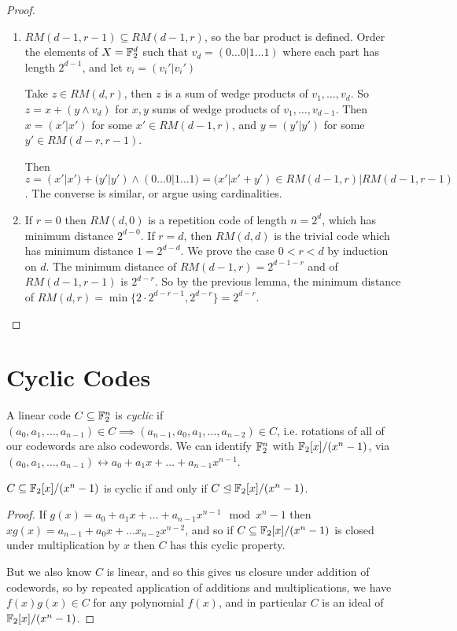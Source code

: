 \documentclass[10pt,a4paper]{article}
\begin{document}
\begin{proof}
\item
\begin{enumerate}
\item $RM(d-1, r-1) \subseteq RM(d-1, r)$, so the bar product is defined. Order the elements of $X = \mathbb{F}_2^d$ such that $v_d = (0\ldots 0 |1\ldots 1)$ where each part has length $2^{d-1}$, and let $v_i = (v_i'|v_i')$

Take $z \in RM(d,r)$, then $z$ is a sum of wedge products of $v_1, \ldots, v_d$. So $z = x+(y \wedge v_d)$ for $x,y$ sums of wedge products of $v_1, \ldots, v_{d-1}$. Then $x = (x'|x')$ for some $x' \in RM(d-1,r)$, and $y = (y'|y')$ for some $y' \in RM(d-r, r-1)$.

Then $z = (x'|x') + (y'|y')\wedge (0\ldots 0|1\ldots 1) = (x'|x'+y') \in RM(d-1,r)|RM(d-1,r-1)$. The converse is similar, or argue using cardinalities.

\item If $r=0$ then $RM(d,0)$ is a repetition code of length $n = 2^d$, which has minimum distance $2^{d-0}$. If $r=d$, then $RM(d,d)$ is the trivial code which has minimum distance $1=2^{d-d}$. We prove the case $0 < r < d$ by induction on $d$. The minimum distance of $RM(d-1,r) = 2^{d-1-r}$ and of $RM(d-1,r-1)$ is $2^{d-r}$. So by the previous lemma, the minimum distance of $RM(d,r) = \min \{2\cdot 2^{d-r-1}, 2^{d-r}\} = 2^{d-r}$.
\end{enumerate}
\end{proof}

\section{Cyclic Codes}
A linear code $C \subseteq \mathbb{F}_2^n$ is \emph{cyclic} if $(a_0, a_1, \ldots, a_{n-1}) \in C \implies (a_{n-1}, a_0, a_1, \ldots, a_{n-2}) \in C$, i.e. rotations of all of our codewords are also codewords. We can identify $\mathbb{F}_2^n$ with $\mathbb{F}_2[x]/(x^n-1)$, via $(a_0,a_1, \ldots, a_{n-1}) \leftrightarrow a_0 + a_1x+\ldots+a_{n-1}x^{n-1}$.
\begin{lemma}
$C \subseteq \mathbb{F}_2[x]/(x^n-1)$ is cyclic if and only if $C \trianglelefteq \mathbb{F}_2[x]/(x^n-1)$.
\end{lemma}
\begin{proof}
If $g(x) = a_0 + a_1 x + \ldots + a_{n-1} x^{n-1} \mod x^n-1$ then $xg(x) = a_{n-1}+a_0 x + \ldots x_{n-2}x^{n-2}$, and so if $C \subseteq \mathbb{F}_2[x]/(x^n-1)$ is closed under multiplication by $x$ then $C$ has this cyclic property.

But we also know $C$ is linear, and so this gives us closure under addition of codewords, so by repeated application of additions and multiplications, we have $f(x)g(x) \in C$ for any polynomial $f(x)$, and in particular $C$ is an ideal of $\mathbb{F}_2[x]/(x^n-1)$.
\end{proof}
\end{document}
